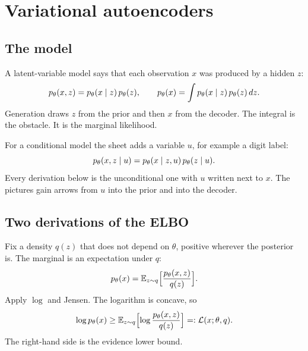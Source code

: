 \chapter{Variational autoencoders}
\label{ch:vae}

\section{The model}

A latent-variable model says that each observation $x$ was produced by a hidden $z$:
\[
p_\theta(x,z)=p_\theta(x\mid z)\,p_\theta(z),\qquad
p_\theta(x)=\int p_\theta(x\mid z)\,p_\theta(z)\,dz.
\]
Generation draws $z$ from the prior and then $x$ from the decoder. The integral is the obstacle. It is the marginal likelihood.

\begin{center}
\end{center}

For a conditional model the sheet adds a variable $u$, for example a digit label:
\[
p_\theta(x,z\mid u)=p_\theta(x\mid z,u)\,p_\theta(z\mid u).
\]
Every derivation below is the unconditional one with $u$ written next to $x$. The pictures gain arrows from $u$ into the prior and into the decoder.

\section{Two derivations of the ELBO}

Fix a density $q(z)$ that does not depend on $\theta$, positive wherever the posterior is. The marginal is an expectation under $q$:
\[
p_\theta(x)=\mathbb{E}_{z\sim q}\Bigl[\frac{p_\theta(x,z)}{q(z)}\Bigr].
\]
Apply $\log$ and Jensen. The logarithm is concave, so
\begin{equation}
\label{eq:elboj}
\log p_\theta(x)
\ge
\mathbb{E}_{z\sim q}\Bigl[\log\frac{p_\theta(x,z)}{q(z)}\Bigr]
=:\mathcal L(x;\theta,q).
\end{equation}
The right-hand side is the evidence lower bound.

